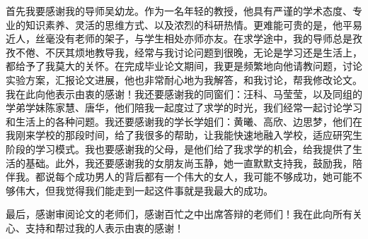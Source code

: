 首先我要感谢我的导师吴幼龙。作为一名年轻的教授，他具有严谨的学术态度、专业的知识素养、灵活的思维方式、以及浓烈的科研热情。更难能可贵的是，他平易近人，丝毫没有老师的架子，与学生相处亦师亦友。在求学途中，我的导师总是孜孜不倦、不厌其烦地教导我，经常与我讨论问题到很晚，无论是学习还是生活上，都给予了我莫大的关怀。在完成毕业论文期间，我更是频繁地向他请教问题，讨论实验方案，汇报论文进展，他也非常耐心地为我解答，和我讨论，帮我修改论文。我在此向他表示由衷的感谢！我还要感谢我的同窗们：汪科、马莹莹，以及同组的学弟学妹陈家慧、唐华，他们陪我一起度过了求学的时光，我们经常一起讨论学习和生活上的各种问题。我还要感谢我的学长学姐们：黄曦、高欣、边思梦，他们在我刚来学校的那段时间，给了我很多的帮助，让我能快速地融入学校，适应研究生阶段的学习模式。我也要感谢我的父母，是他们给了我求学的机会，给我提供了生活的基础。此外，我还要感谢我的女朋友尚玉静，她一直默默支持我，鼓励我，陪伴我。都说每个成功男人的背后都有一个伟大的女人，我可能不够成功，她可能不够伟大，但我觉得我们能走到一起这件事就是我最大的成功。

最后，感谢审阅论文的老师们，感谢百忙之中出席答辩的老师们！我在此向所有关心、支持和帮过我的人表示由衷的感谢！

\cleardoublepage[plain]%
